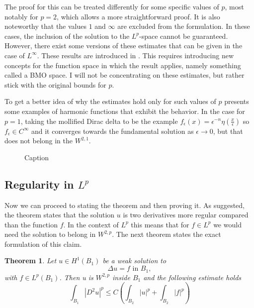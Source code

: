 \documentclass[12pt]{artikel1}
\newtheorem{theorem}{Theorem}[section]
\begin{document}
\noindent The proof for this can be treated differently for some specific values of $p$, most notably for $p=2$, which allows a more straightforward proof. It is also noteworthy that the values $1$ and $\infty$ are excluded from the formulation. In these cases, the inclusion of the solution to the $L^p$-space cannot be guaranteed. However, there exist some versions of these estimates that can be given in the case of $L^\infty$. These results are introduced in \cite{sanpera}. This requires introducing new concepts for the function space in which the result applies, namely something called a BMO space. I will not be concentrating on these estimates, but rather stick with the original bounds for $p$.

To get a better idea of why the estimates hold only for such values of $p$ \cite{Fern_ndez_Real_2022} presents some examples of harmonic functions that exhibit the behavior. In the case for $p=1$, taking the mollified Dirac delta to be the example $f_\epsilon(x)=\epsilon^{-n}\eta(\frac{x}{\epsilon})$ so $f_\epsilon\in C^{\infty}$ and it converges towards the fundamental solution as $\epsilon\rightarrow0$, but that does not belong in the $W^{2,1}$.

\begin{figure}[h]
    \centering
    
    \caption{Caption}
    \label{fig:failure}
\end{figure}

\subsection*{Regularity in $L^p$}

Now we can proceed to stating the theorem and then proving it. As suggested, the theorem states that the solution $u$ is two derivatives more regular compared than the function $f$. In the context of $L^p$ this means that for $f\in L^p$ we would need the solution to belong in $W^{2,p}$. The next theorem states the exact formulation of this claim.

\begin{theorem}
    Let $u\in H^1(B_1)$ be a weak solution to
    \begin{equation*}
        \Delta u=f\text{ in }B_1,
    \end{equation*}
    with $f\in L^p(B_1)$. Then u is $W^{2,p}$ inside $B_1$ and the following estimate holds
    \begin{equation*}
        \int_{B_1}|D^2u|^p\leq C\left(\int_{B_2}|u|^p+\int_{B_2}|f|^p\right)
    \end{equation*}
\end{theorem}
\end{document}
